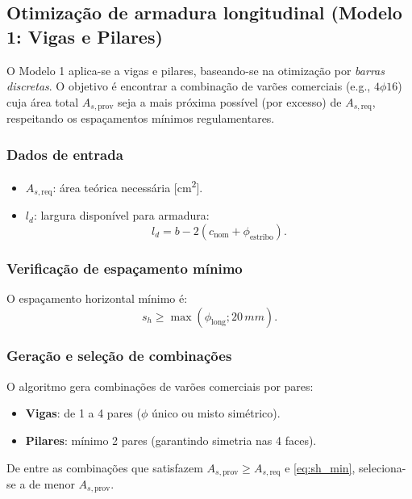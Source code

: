 \subsection{Otimização de armadura longitudinal (Modelo 1: Vigas e Pilares)}

O Modelo 1 aplica-se a vigas e pilares, baseando-se na otimização por \emph{barras discretas}. O objetivo é encontrar a combinação de varões comerciais (e.g., $4\phi16$) cuja área total $A_{s,\text{prov}}$ seja a mais próxima possível (por excesso) de $A_{s,\text{req}}$, respeitando os espaçamentos mínimos regulamentares.

\subsubsection{Dados de entrada}
\begin{itemize}
\item $A_{s,\text{req}}$: área teórica necessária [\si{cm^2}].
\item $l_d$: largura disponível para armadura:
\begin{equation}
l_d = b - 2(c_\text{nom} + \phi_\text{estribo}).
\end{equation}
\end{itemize}

\subsubsection{Verificação de espaçamento mínimo}
O espaçamento horizontal mínimo é:
\begin{equation}
s_h \geq \max(\phi_\text{long}; 20\,\si{mm}).
\label{eq:sh_min}
\end{equation}

\subsubsection{Geração e seleção de combinações}
O algoritmo gera combinações de varões comerciais por pares:
\begin{itemize}
\item \textbf{Vigas}: de 1 a 4 pares ($\phi$ único ou misto simétrico).
\item \textbf{Pilares}: mínimo 2 pares (garantindo simetria nas 4 faces).
\end{itemize}

De entre as combinações que satisfazem $A_{s,\text{prov}} \geq A_{s,\text{req}}$ e \eqref{eq:sh_min}, seleciona-se a de menor $A_{s,\text{prov}}$.

